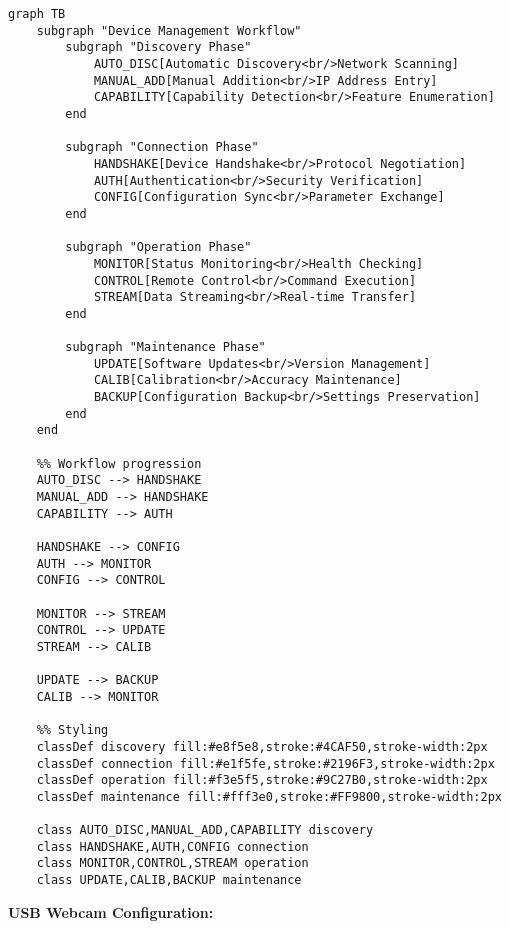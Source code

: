 \documentclass[12pt,a4paper]{article}
\begin{document}
\begin{verbatim}
graph TB
    subgraph "Device Management Workflow"
        subgraph "Discovery Phase"
            AUTO_DISC[Automatic Discovery<br/>Network Scanning]
            MANUAL_ADD[Manual Addition<br/>IP Address Entry]
            CAPABILITY[Capability Detection<br/>Feature Enumeration]
        end
        
        subgraph "Connection Phase"
            HANDSHAKE[Device Handshake<br/>Protocol Negotiation]
            AUTH[Authentication<br/>Security Verification]
            CONFIG[Configuration Sync<br/>Parameter Exchange]
        end
        
        subgraph "Operation Phase"
            MONITOR[Status Monitoring<br/>Health Checking]
            CONTROL[Remote Control<br/>Command Execution]
            STREAM[Data Streaming<br/>Real-time Transfer]
        end
        
        subgraph "Maintenance Phase"
            UPDATE[Software Updates<br/>Version Management]
            CALIB[Calibration<br/>Accuracy Maintenance]
            BACKUP[Configuration Backup<br/>Settings Preservation]
        end
    end
    
    %% Workflow progression
    AUTO_DISC --> HANDSHAKE
    MANUAL_ADD --> HANDSHAKE
    CAPABILITY --> AUTH
    
    HANDSHAKE --> CONFIG
    AUTH --> MONITOR
    CONFIG --> CONTROL
    
    MONITOR --> STREAM
    CONTROL --> UPDATE
    STREAM --> CALIB
    
    UPDATE --> BACKUP
    CALIB --> MONITOR
    
    %% Styling
    classDef discovery fill:#e8f5e8,stroke:#4CAF50,stroke-width:2px
    classDef connection fill:#e1f5fe,stroke:#2196F3,stroke-width:2px
    classDef operation fill:#f3e5f5,stroke:#9C27B0,stroke-width:2px
    classDef maintenance fill:#fff3e0,stroke:#FF9800,stroke-width:2px
    
    class AUTO_DISC,MANUAL_ADD,CAPABILITY discovery
    class HANDSHAKE,AUTH,CONFIG connection
    class MONITOR,CONTROL,STREAM operation
    class UPDATE,CALIB,BACKUP maintenance
\end{verbatim}

\textbf{USB Webcam Configuration:}
\end{document}
